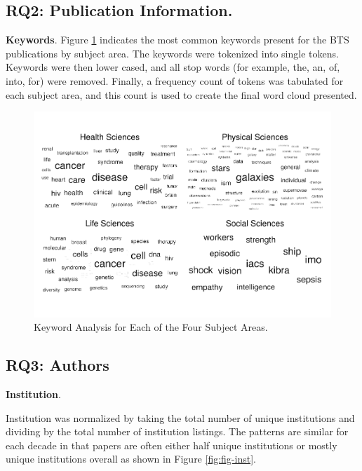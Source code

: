 \documentclass[
  man,floatsintext]{apa6}
\begin{document}
\hypertarget{rq2-publication-information.-1}{%
\subsection{RQ2: Publication Information.}\label{rq2-publication-information.-1}}

\textbf{Keywords}. Figure \ref{fig:fig-keywords} indicates the most common keywords present for the BTS publications by subject area. The keywords were tokenized into single tokens. Keywords were then lower cased, and all stop words (for example, the, an, of, into, for) were removed. Finally, a frequency count of tokens was tabulated for each subject area, and this count is used to create the final word cloud presented.

\begin{figure}
\centering
\includegraphics{manuscript_scopus_files/figure-latex/fig-keywords-1.pdf}
\caption{\label{fig:fig-keywords}Keyword Analysis for Each of the Four Subject Areas.}
\end{figure}

\hypertarget{rq3-authors}{%
\subsection{RQ3: Authors}\label{rq3-authors}}

\textbf{Institution}.

Institution was normalized by taking the total number of unique institutions and dividing by the total number of institution listings. The patterns are similar for each decade in that papers are often either half unique institutions or mostly unique institutions overall as shown in Figure \ref{fig:fig-inst}.
\end{document}
